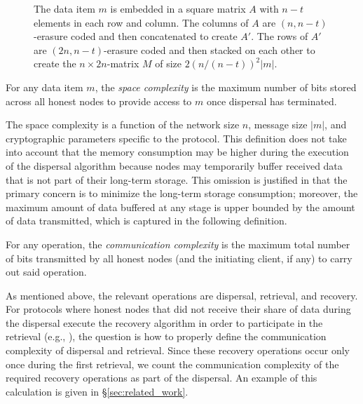 \documentclass[sigconf,screen]{acmart}
\begin{document}
\begin{figure}[t]
\begin{subfigure}[b]{0.38\textwidth}
    \end{subfigure}
		\caption{
		The data item $m$ is embedded in a square matrix $A$ with $n-t$ elements in each row and column.
		The columns of $A$ are $(n, n-t)$-erasure coded and then concatenated to create $A'$.
		The rows of $A'$ are $(2n, n-t)$-erasure coded and then stacked on each other to create the $n \times 2n$-matrix $M$ of size $2(n/(n-t))^2|m|$.}
		\label{fig:encoding}
\end{figure}

\begin{definition} For any data item $m$, the \emph{space complexity} is the maximum number of bits stored across all honest nodes to provide access to $m$ once dispersal has terminated.
\end{definition}

The space complexity is a function of the network size $n$, message size $|m|$, and cryptographic parameters specific to the protocol.
This definition does not take into account that the memory consumption may be higher during the execution of the dispersal algorithm because nodes may temporarily buffer received data that is not part of their long-term storage. This omission is justified in that the primary concern is to minimize the long-term storage consumption; moreover, the maximum amount of data buffered at any stage is upper bounded by the amount of data transmitted, which is captured in the following definition.

\begin{definition} For any operation, the \emph{communication complexity} is the maximum total number of bits transmitted by all honest nodes (and the initiating client, if any) to carry out said operation.
\end{definition}

As mentioned above, the relevant operations are dispersal, retrieval, and recovery.
For protocols where honest nodes that did not receive their share of data during the dispersal execute the recovery algorithm in order to participate in the retrieval (e.g., \cite{danezis2025}), the question is how to properly define the communication complexity of dispersal and retrieval.
Since these recovery operations occur only once during the first retrieval, we count the communication complexity of the required recovery operations as part of the dispersal. An example of this calculation is given in \S\ref{sec:related_work}.
\end{document}
